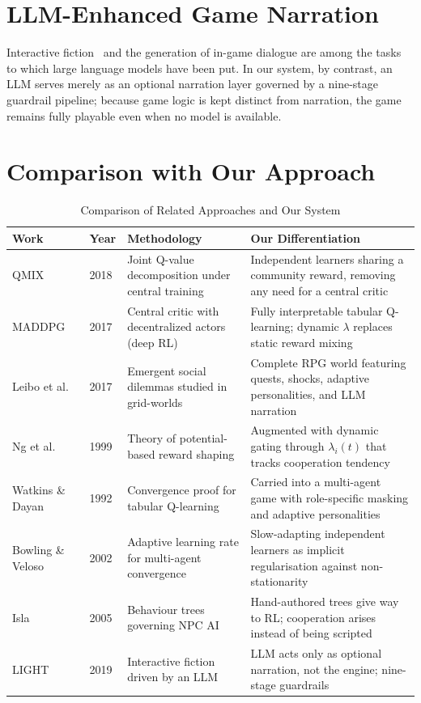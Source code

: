 \documentclass[12pt, a4paper, oneside]{report}
\begin{document}
\section{LLM-Enhanced Game Narration}
\label{sec:llm-narration}

Interactive fiction~\cite{urbanek2019light} and the generation of in-game dialogue are among the tasks to which large language models have been put. In our system, by contrast, an LLM serves merely as an optional narration layer governed by a nine-stage guardrail pipeline; because game logic is kept distinct from narration, the game remains fully playable even when no model is available.

\section{Comparison with Our Approach}
\label{sec:lit-comparison}

\begin{table}[H]
\centering
\caption{Comparison of Related Approaches and Our System}
\label{tab:lit-comparison}
\small
\begin{tabularx}{\textwidth}{|l|l|X|X|}
\hline
\textbf{Work} & \textbf{Year} & \textbf{Methodology} & \textbf{Our Differentiation} \\
\hline
QMIX~\cite{rashid2018qmix} & 2018 & Joint Q-value decomposition under central training & Independent learners sharing a community reward, removing any need for a central critic \\
\hline
MADDPG~\cite{lowe2017maddpg} & 2017 & Central critic with decentralized actors (deep RL) & Fully interpretable tabular Q-learning; dynamic $\lambda$ replaces static reward mixing \\
\hline
Leibo et al.~\cite{leibo2017multi} & 2017 & Emergent social dilemmas studied in grid-worlds & Complete RPG world featuring quests, shocks, adaptive personalities, and LLM narration \\
\hline
Ng et al.~\cite{ng1999rewardshaping} & 1999 & Theory of potential-based reward shaping & Augmented with dynamic gating through $\lambda_i(t)$ that tracks cooperation tendency \\
\hline
Watkins \& Dayan~\cite{watkins1992qlearning} & 1992 & Convergence proof for tabular Q-learning & Carried into a multi-agent game with role-specific masking and adaptive personalities \\
\hline
Bowling \& Veloso~\cite{bowling2002multiagent} & 2002 & Adaptive learning rate for multi-agent convergence & Slow-adapting independent learners as implicit regularisation against non-stationarity \\
\hline
Isla~\cite{isla2005bt} & 2005 & Behaviour trees governing NPC AI & Hand-authored trees give way to RL; cooperation arises instead of being scripted \\
\hline
LIGHT~\cite{urbanek2019light} & 2019 & Interactive fiction driven by an LLM & LLM acts only as optional narration, not the engine; nine-stage guardrails \\
\hline
\end{tabularx}
\end{table}
\end{document}
